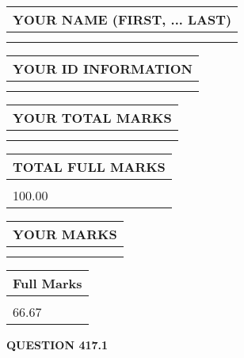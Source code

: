 \documentclass{ctexart}
\begin{document}
   
   
   
\newpage 
\setcounter{page}{ 
   417001 } 
   
   
   
   
\noindent\begin{tabular}{|l|}
\hline
YOUR NAME (FIRST, ... LAST)  \\
\hline
 \\ 
 \\ 
\hline
\end{tabular}
\hspace{0.05in} \begin{tabular}{|l|}
\hline
 YOUR   ID   INFORMATION  \\
\hline
 \\ 
 \\ 
\hline
\end{tabular}
   
   
\vspace{0.2in}\noindent\begin{tabular}{|l|}
\hline
YOUR TOTAL MARKS  \\
\hline
 \\ 
 \\ 
\hline
\end{tabular}
\hspace{0.05in} \begin{tabular}{|l|}
\hline
TOTAL FULL MARKS  \\
\hline
 \\ 
100.00 \\
\hline
\end{tabular}
   
   
 \vspace{0.2in}
 
 
 
 
   
   
  
\vspace{0.2in}
  
\noindent\begin{tabular}{|l|}
\hline
 YOUR MARKS  \\
\hline
 \\ 
 \\ 
\hline
\end{tabular}
\hspace{0.05in} \begin{tabular}{|l|}
\hline
 Full Marks  \\
\hline
 \\ 
66.67 \\
\hline
\end{tabular}
{\textbf{\Large{QUESTION
417.1 
}}}
  
\end{document}
